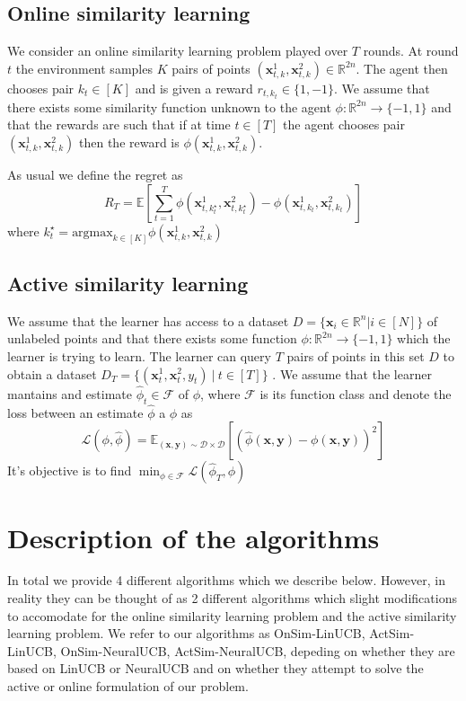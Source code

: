 \documentclass{article}
\begin{document}
\subsection{Online similarity learning}
\label{problem-statement:online-similarity-learning}
We consider an online similarity learning problem played over $T$ rounds.
At round $t$ the environment samples $K$ pairs of points $(\mathbf{x}_{t,k}^1, \mathbf{x}_{t,k}^2) \in \mathbb{R}^{2n}$.
The agent then chooses pair $k_t \in [K]$ and is given a reward $r_{t,k_{t}} \in \{1, -1\}$.
We assume that there exists some similarity function unknown to the agent $\phi: \mathbb{R}^{2n} \to \{-1, 1 \}$
and that the rewards are such that if at time $t \in [T]$ the agent chooses pair $(\mathbf{x}_{t,k}^1, \mathbf{x}_{t,k}^2)$
then the reward is $\phi(\mathbf{x}_{t,k}^1, \mathbf{x}_{t,k}^2)$.

As usual we define the regret as
\[ R_T = \mathbb{E}\left[\sum_{t =1}^T \phi(\mathbf{x}_{t,k^\star_t}^1, \mathbf{x}_{t,k^\star_t}^2) - \phi(\mathbf{x}_{t,k_t}^1, \mathbf{x}_{t,k_t}^2)\right]\]
where $k_t^\star = \text{argmax}_{k\in [K]} \phi(\mathbf{x}_{t,k}^1, \mathbf{x}_{t,k}^2)$

\subsection{Active similarity learning}
\label{problem-statement:active-similarity-learning}
We assume that the learner has access to a dataset $D = \{\mathbf{x}_i \in \mathbb{R}^n| i \in [N]\}$ of unlabeled points and that there exists some function $\phi: \mathbb{R}^{2n} \to \{-1, 1\}$ which the learner is trying to learn.
The learner can query $T$ pairs of points in this set $D$ to obtain a dataset $D_T = \{(\mathbf{x}_t^1, \mathbf{x}_t^2, y_t) ~|  ~t \in [T]\}$ . We assume that the learner mantains and estimate $\hat{\phi}_t \in \mathcal{F}$ of $\phi$, where $\mathcal{F}$ is its function class  and denote the loss between an estimate $\hat{\phi}$ a $\phi$ as
\[ \mathcal{L}(\phi, \hat{\phi}) = \mathbb{E}_\mathcal{(\mathbf{x}, \mathbf{y}) \sim \mathcal{D} \times \mathcal{D}}[(\hat{\phi}(\mathbf{x},\mathbf{y}) - \phi(\mathbf{x}, \mathbf{y}))^2] \]
It's objective is to find $\min_{\phi \in \mathcal{F}} \mathcal{L}(\hat{\phi}_T, \phi)$


\section{Description of the algorithms}
In total we provide 4 different algorithms which we describe below.
However, in reality they can be thought of as 2 different algorithms which slight modifications to accomodate for the online similarity learning problem and the active similarity learning problem. We refer to our algorithms as OnSim-LinUCB, ActSim-LinUCB,
OnSim-NeuralUCB, ActSim-NeuralUCB, depeding on whether they are based on LinUCB or NeuralUCB and on whether they attempt to solve
the active or online formulation of our problem.
\end{document}
